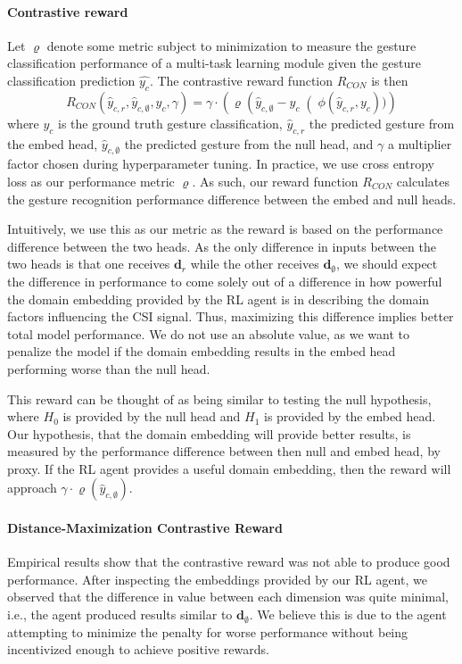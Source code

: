 \paragraph{Contrastive reward}
Let $\varrho$ denote some metric subject to minimization to measure the gesture classification performance of a multi-task learning module given the gesture classification prediction $\hat{y_{c}}$.
The contrastive reward function $R_{CON}$ is then 
\begin{equation}
	R_{CON}(\hat{y}_{c,r}, \hat{y}_{c,\emptyset}, y_c, \gamma) = \gamma \cdot \left(\varrho\left(\hat{y}_{c,\emptyset} - y_c\right(\phi\left(\hat{y}_{c,r}, y_c\right))\right)
\end{equation}
where $y_c$ is the ground truth gesture classification, $\hat{y}_{c,r} $ the predicted gesture from the embed head, $\hat{y}_{c,\emptyset}$ the predicted gesture from the null head, and $\gamma$ a multiplier factor chosen during hyperparameter tuning.
In practice, we use cross entropy loss as our performance metric $\varrho$.
As such, our reward function $R_{CON}$ calculates the gesture recognition performance difference between the embed and null heads.

Intuitively, we use this as our metric as the reward is based on the performance difference between the two heads.
As the only difference in inputs between the two heads is that one receives $\boldsymbol{d}_r$ while the other receives $\boldsymbol{d}_\emptyset$, we should expect the difference in performance to come solely out of a difference in how powerful the domain embedding provided by the RL agent is in describing the domain factors influencing the CSI signal.
Thus, maximizing this difference implies better total model performance.
We do not use an absolute value, as we want to penalize the model if the domain embedding results in the embed head performing worse than the null head.

This reward can be thought of as being similar to testing the null hypothesis, where $H_0$ is provided by the null head and $H_1$ is provided by the embed head.
Our hypothesis, that the domain embedding will provide better results, is measured by the performance difference between then null and embed head, by proxy.
If the RL agent provides a useful domain embedding, then the reward will approach $\gamma \cdot \varrho\left(\hat{y}_{c,\emptyset}\right)$.

\paragraph{Distance-Maximization Contrastive Reward}
Empirical results show that the contrastive reward was not able to produce good performance.
After inspecting the embeddings provided by our RL agent, we observed that the difference in value between each dimension was quite minimal, i.e., the agent produced results similar to $\boldsymbol{d}_\emptyset$.
We believe this is due to the agent attempting to minimize the penalty for worse performance without being incentivized enough to achieve positive rewards.

